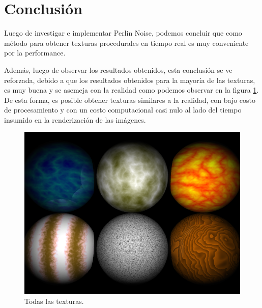 \documentclass[a4paper,10pt]{article}
\begin{document}
\section{Conclusión}
\label{conclusiones}

Luego de investigar e implementar Perlin Noise, podemos concluir que como
método para obtener texturas procedurales en tiempo real es muy conveniente por
la performance.

Además, luego de observar los resultados obtenidos, esta conclusión se ve
reforzada, debido a que los resultados obtenidos para la mayoría de las
texturas, es muy buena y se asemeja con la realidad como podemos observar en
la figura \ref{fig:figure7}. De esta forma, es posible obtener texturas
similares a la realidad, con bajo costo de procesamiento y con un costo
computacional casi nulo al lado del tiempo insumido en la renderización de las
imágenes.

\begin{figure}[h!]
 \centering
 \includegraphics[scale=0.5]{./sceneprocedural.png}
 \caption{Todas las texturas.}
 \label{fig:figure7}
\end{figure}
\end{document}
